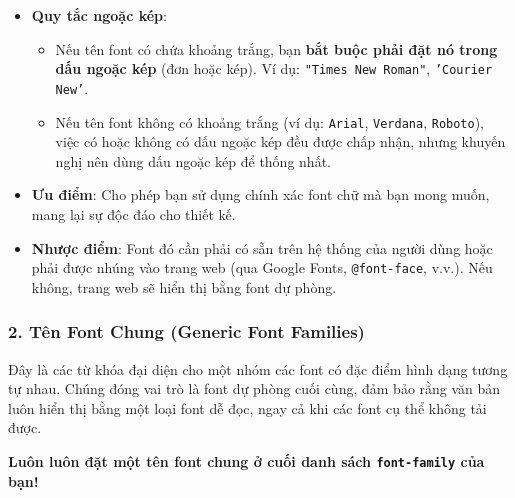 \documentclass[11pt,oneside]{book}
\newcommand{\codeinline}[1]{\textcolor{accentOrange}{\texttt{#1}}}
\begin{document}
\begin{conceptBox}
\begin{itemize}[leftmargin=1.5em, itemsep=3pt, parsep=0pt]
    \item \textbf{Quy tắc ngoặc kép}:
    \begin{itemize}[leftmargin=1.2em, itemsep=2pt]
        \item Nếu tên font có chứa khoảng trắng, bạn \textbf{bắt buộc phải đặt nó trong dấu ngoặc kép} (đơn hoặc kép). Ví dụ: \codeinline{"Times New Roman"}, \codeinline{'Courier New'}.
        \item Nếu tên font không có khoảng trắng (ví dụ: \codeinline{Arial}, \codeinline{Verdana}, \codeinline{Roboto}), việc có hoặc không có dấu ngoặc kép đều được chấp nhận, nhưng khuyến nghị nên dùng dấu ngoặc kép để thống nhất.
    \end{itemize}
    \item \textbf{Ưu điểm}: Cho phép bạn sử dụng chính xác font chữ mà bạn mong muốn, mang lại sự độc đáo cho thiết kế.
    \item \textbf{Nhược điểm}: Font đó cần phải có sẵn trên hệ thống của người dùng hoặc phải được nhúng vào trang web (qua Google Fonts, \codeinline{@font-face}, v.v.). Nếu không, trang web sẽ hiển thị bằng font dự phòng.
\end{itemize}
\end{conceptBox}

\subsubsection*{2. Tên Font Chung (Generic Font Families)}
Đây là các từ khóa đại diện cho một nhóm các font có đặc điểm hình dạng tương tự nhau. Chúng đóng vai trò là font dự phòng cuối cùng, đảm bảo rằng văn bản luôn hiển thị bằng một loại font dễ đọc, ngay cả khi các font cụ thể không tải được.

\begin{warnBox}
\textbf{Luôn luôn đặt một tên font chung ở cuối danh sách \codeinline{font-family} của bạn!}
\end{warnBox}
\end{document}
